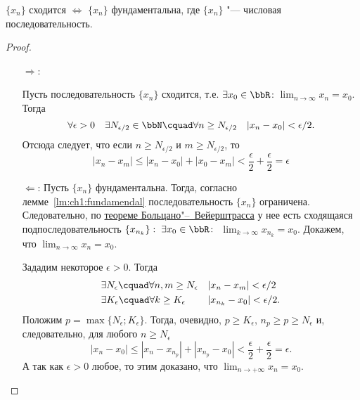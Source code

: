 \begin{thm} 
$\{x_n\}$ сходится $\Longleftrightarrow$ $\{x_n\}$ фундаментальна, где $\{x_n\}$ "--- числовая последовательность.
\end{thm}
\begin{proof}\leavevmode
\begin{itemize}[wide, labelwidth=!, labelindent=0pt]
\item[$\Longrightarrow$:]

Пусть последовательность $\{x_n\}$ сходится, т.е. $\exists x_{0} \in \bbR$:  $\lim_{n \to \infty}\limits x_n = x_0$. Тогда 
$$
\forall \epsilon > 0\quad \exists N_{\epsilon/2} \in \bbN\cquad \forall n \ge N_{\epsilon/2}\quad |x_n-x_0|<\epsilon/2.
$$
Отсюда следует, что если $n \ge N_{\epsilon/2}$ и $m \ge N_{\epsilon/2}$, то
$$
|x_n-x_m| \le |x_n-x_0|+|x_0-x_m| <\frac{\epsilon}{2}+\frac{\epsilon}{2}=\epsilon
$$

\item[$\Longleftarrow$:]
Пусть $\{x_n\}$ фундаментальна. Тогда, согласно лемме~\ref{lm:ch1:fundamendal} последовательность $\{x_n\}$ ограничена. Следовательно, по \hyperref[th:ch1:TBV]{теореме Больцано"--~Вейерштрасса} у нее есть сходящаяся подпоследовательность $\{x_{n_k}\}: \;\exists x_0 \in \bbR\colon$ $\lim_{k \to \infty}\limits x_{n_k} =x_0 $. Докажем, что $\lim_{n \to \infty}\limits x_{n}=x_0 $.

Зададим некоторое $\epsilon > 0$. Тогда
\begin{gather*}
\begin{aligned}
& \exists N_\epsilon\cquad \forall n,m \ge N_\epsilon &&|x_n-x_m|<\epsilon/2\\
& \exists K_\epsilon\cquad \forall k \ge K_\epsilon   &&|x_{n_k}-x_0|<\epsilon/2.
\end{aligned}
\end{gather*}
Положим $p=\max\{N_\epsilon;K_\epsilon\}$. Тогда, очевидно, $p \ge K_\epsilon$, $n_p \ge p \ge N_\epsilon$ и, следовательно, для любого $n \ge N_\epsilon$
$$
|x_n-x_0| \le |x_n-x_{n_p}|+|x_{n_p}-x_0|<\frac{\epsilon}{2}+\frac{\epsilon}{2}=\epsilon.
$$
А так как $\epsilon > 0$ любое, то этим доказано, что $\lim_{n \to +\infty}\limits x_n = x_0$. \qedhere
\end{itemize}
\end{proof}
